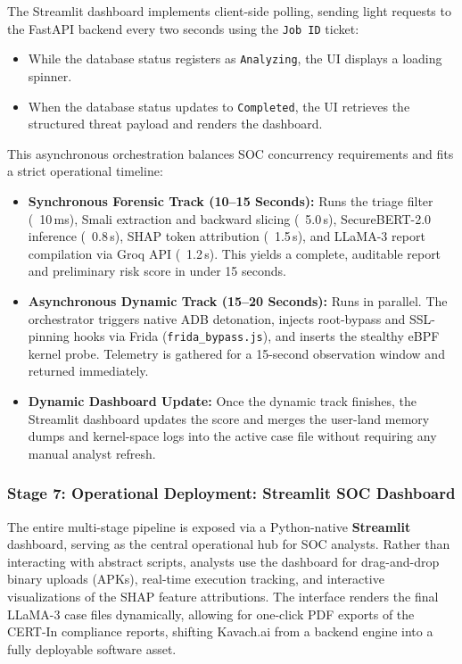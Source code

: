\documentclass[10pt,a4paper]{article}
\begin{document}
The Streamlit dashboard implements client-side polling, sending light requests to the FastAPI backend every two seconds using the \texttt{Job ID} ticket:
\begin{itemize}
  \item While the database status registers as \texttt{Analyzing}, the UI displays a loading spinner.
  \item When the database status updates to \texttt{Completed}, the UI retrieves the structured threat payload and renders the dashboard.
\end{itemize}

This asynchronous orchestration balances SOC concurrency requirements and fits a strict operational timeline:
\begin{itemize}
  \item \textbf{Synchronous Forensic Track (10--15 Seconds):} Runs the triage filter (~10\,ms), Smali extraction and backward slicing (~5.0\,s), SecureBERT-2.0 inference (~0.8\,s), SHAP token attribution (~1.5\,s), and LLaMA-3 report compilation via Groq API (~1.2\,s). This yields a complete, auditable report and preliminary risk score in under 15 seconds.
  \item \textbf{Asynchronous Dynamic Track (15--20 Seconds):} Runs in parallel. The orchestrator triggers native ADB detonation, injects root-bypass and SSL-pinning hooks via Frida (\texttt{frida\_bypass.js}), and inserts the stealthy eBPF kernel probe. Telemetry is gathered for a 15-second observation window and returned immediately.
  \item \textbf{Dynamic Dashboard Update:} Once the dynamic track finishes, the Streamlit dashboard updates the score and merges the user-land memory dumps and kernel-space logs into the active case file without requiring any manual analyst refresh.
\end{itemize}

\subsubsection*{Stage 7: Operational Deployment: Streamlit SOC Dashboard}
The entire multi-stage pipeline is exposed via a Python-native \textbf{Streamlit} dashboard, serving as the central operational hub for SOC analysts. Rather than interacting with abstract scripts, analysts use the dashboard for drag-and-drop binary uploads (APKs), real-time execution tracking, and interactive visualizations of the SHAP feature attributions. The interface renders the final LLaMA-3 case files dynamically, allowing for one-click PDF exports of the CERT-In compliance reports, shifting Kavach.ai from a backend engine into a fully deployable software asset.
\end{document}
